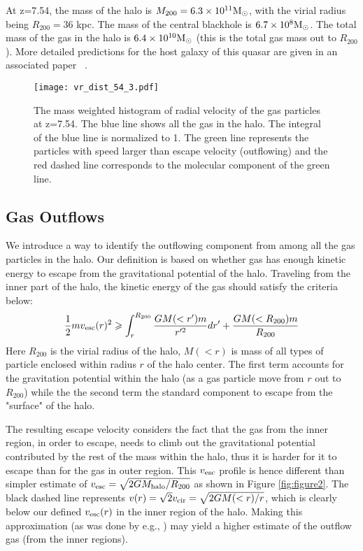 \documentclass[a4paper,usenatbib]{mnras}
\begin{document}
At z=7.54, the mass of the halo is $M_{200}=6.3\times 10^{11}{\rm M}_\odot$, with the virial radius being $R_{200}=36$ kpc. The mass of the central blackhole is $6.7\times 10^{8}{\rm M}_\odot$.  The total mass of the gas in the halo is $6.4\times10^{10}{\rm M}_\odot$ (this is the total gas mass out to $R_{200}$). 
More detailed predictions for the host galaxy of this quasar are given in an associated paper ~\citep[][see also Table 1]{Tenneti2018}.

\begin{figure}
\texttt{[image: vr\_dist\_54\_3.pdf]}
\caption{The mass weighted histogram of radial velocity of the gas particles at z=7.54. The blue line shows all the gas in the halo. The integral of the blue line is normalized to 1. The green line represents the particles with speed larger than escape velocity (outflowing) and the red dashed line corresponds to the molecular component of the green line.}
\label{fig:figure3}
\end{figure}

\subsection{Gas Outflows}
We introduce a way to identify the outflowing component from among all the gas particles in the halo. Our definition is based on whether gas has enough kinetic energy to escape from the gravitational potential of the halo. Traveling from the inner part of the halo, the kinetic energy of the gas should satisfy the criteria below:
\begin{equation}
    \frac{1}{2}m v_{\rm esc}(r)^2 \geqslant \int_{r}^{R_{200}} \frac{G M(<r') m}{r'^2} dr' +  \frac{G M(<R_{200}) m}{R_{200}}
\end{equation}
Here $R_{200}$ is the virial radius of the halo, $M(<r)$ is mass of all types of particle enclosed within radius $r$ of the halo center. 
The first term accounts for the gravitation potential within the halo (as a gas particle move from $r$ out to $R_{200}$) while the  the second term the standard  component to escape from the "surface" of the halo.

The resulting escape velocity considers the fact that the gas from the inner region, in order to escape, needs to climb out the gravitational potential contributed by the rest of the mass within the halo, thus it is harder for it to escape than for the gas in outer region. This $v_{\rm esc}$ profile is hence different than simpler estimate of $v_{\rm esc}=\sqrt{2GM_{\rm halo}/R_{200}}$ as shown in Figure \ref{fig:figure2}. The black dashed line represents $v(r)=\sqrt{2}v_{\rm cir}=\sqrt{2GM(<r)/r}$, which is clearly below  our defined $v_{\rm{esc}}(r)$ in the inner region of the halo.  Making this
approximation (as was done by e.g., \cite{Barai2018}) may yield a higher estimate of the outflow gas (from the inner regions). 
\end{document}
